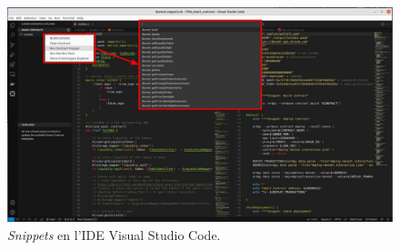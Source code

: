 \documentclass[11pt,a4paper]{article}
\begin{document}
\begin{figure}[h]
\includegraphics[width=1\textwidth]{test-snippets.png}
\centering
\caption{\textit{Snippets} en l'IDE Visual Studio Code.}\label{fig:test-snippets}
\end{figure} 
\end{document}

